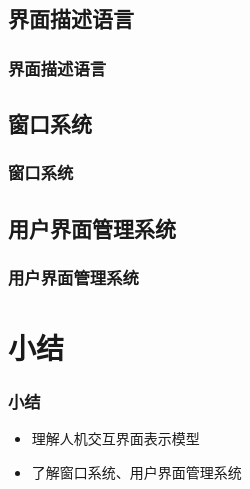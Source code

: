 \documentclass{beamer}
\begin{document}
\subsection{界面描述语言}
\begin{frame}
	\frametitle{界面描述语言}

\end{frame}

\subsection{窗口系统}
\begin{frame}
	\frametitle{窗口系统}

\end{frame}

\subsection{用户界面管理系统}
\begin{frame}
	\frametitle{用户界面管理系统}

\end{frame}

\section{小结}
\begin{frame}
	\frametitle{小结}
	\begin{itemize}
		\item 理解人机交互界面表示模型
		\item 了解窗口系统、用户界面管理系统
	\end{itemize}
\end{frame}
\end{document}
